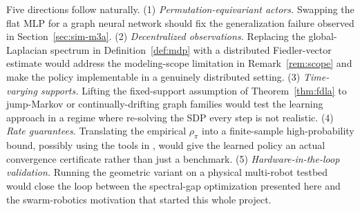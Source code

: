 \documentclass[letterpaper, 11 pt, journal, twoside]{IEEEtran}
\begin{document}
Five directions follow naturally. (1) \emph{Permutation-equivariant
actors.} Swapping the flat MLP for a graph neural network
\cite{KipfWelling2017,Dai2017,Darvariu2021} should fix the
generalization failure observed in Section~\ref{sec:sim-m3a}.
(2) \emph{Decentralized observations.} Replacing the
global-Laplacian spectrum in Definition~\ref{def:mdp} with a
distributed Fiedler-vector estimate
\cite{YangFreeman2010,SabattiniEtAl2013} would address the
modeling-scope limitation in Remark~\ref{rem:scope} and make the
policy implementable in a genuinely distributed setting.
(3) \emph{Time-varying supports.} Lifting the fixed-support
assumption of Theorem~\ref{thm:fdla} to jump-Markov or
continually-drifting graph families would test the learning approach
in a regime where re-solving the SDP every step is not realistic.
(4) \emph{Rate guarantees.} Translating the empirical $\rho_\pi$
into a finite-sample high-probability bound, possibly using the
tools in \cite{Olshevsky2009}, would give the learned policy an
actual convergence certificate rather than just a benchmark.
(5) \emph{Hardware-in-the-loop validation.} Running the geometric
variant on a physical multi-robot testbed would close the loop
between the spectral-gap optimization presented here and the
swarm-robotics motivation that started this whole project.



\end{document}
